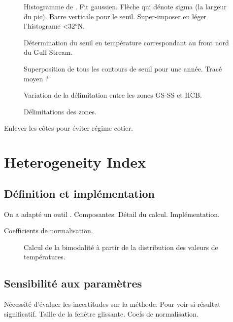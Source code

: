 \documentclass[index]{subfiles}
\begin{document}
\begin{figure}
  Histogramme de . Fit gaussien. Flèche qui dénote sigma (la largeur du pic).
  Barre verticale pour le seuil.
  Super-imposer en léger l'histograme <32°N.
  \caption{Détermination du seuil en température correspondant au front nord du Gulf Stream.}
  \label{fig:seuil-temp}
\end{figure}


\begin{figure}
  Superposition de tous les contours de seuil pour une année.
  Tracé moyen ?
  \caption{Variation de la délimitation entre les zones GS-SS et HCB.}
  \label{fig:var-delim}
\end{figure}


\begin{figure}
  \caption{Délimitations des zones.}
  \label{fig:zone-delimitation}
\end{figure}

Enlever les côtes pour éviter régime cotier.

\section{Heterogeneity Index}
\label{sec:HI}

\subsection{Définition et implémentation}
\label{sec:HI-definition}

On a adapté un outil \parencite{liu_2016}.
Composantes.
Détail du calcul.
Implémentation.

Coefficients de normalisation.

\begin{figure}
  \centering
  \caption[Calcul de la bimodalité]{Calcul de la bimodalité à partir de la distribution des valeurs de températures.}
  \label{fig:bimodality}
\end{figure}

\subsection{Sensibilité aux paramètres}
\label{sec:HI-sensibilite}

Nécessité d'évaluer les incertitudes sur la méthode.
Pour voir si résultat significatif.
Taille de la fenêtre glissante. Coefs de normalisation.
\end{document}
